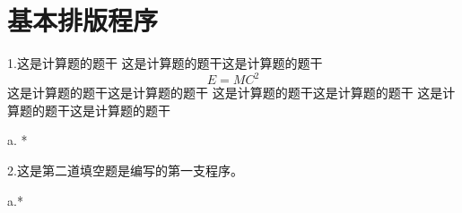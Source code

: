 \documentclass[a4paper,fontset = windowsnew]{ctexbook}
\begin{document}
\chapter{基本排版程序}

\begin{blanks}
1.这是计算题的题干
这是计算题的题干这是计算题的题干
\begin{equation}
  E=MC^2
\end{equation}
这是计算题的题干这是计算题的题干
这是计算题的题干这是计算题的题干
这是计算题的题干这是计算题的题干
\par

a. *

2.这是第二道填空题是编写的第一支程序。

a.*

\end{blanks}

\makeanswer
\end{document}
